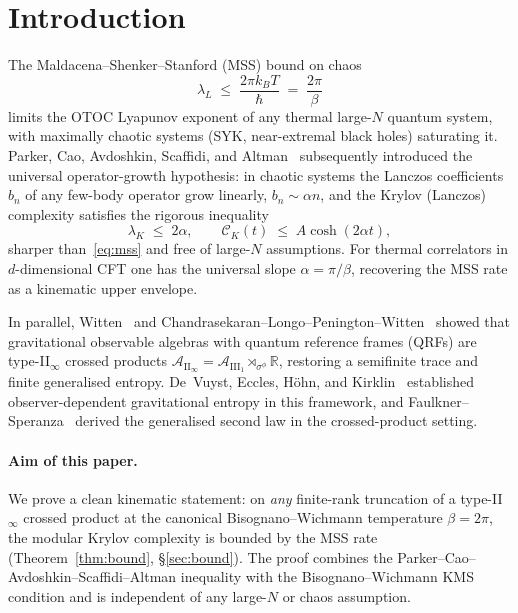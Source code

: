 \documentclass[12pt,a4paper]{article}
\begin{document}
\section{Introduction}
\label{sec:intro}

The Maldacena--Shenker--Stanford (MSS) bound on chaos~\cite{MSS2016}
\begin{equation}
  \lambda_L \;\le\; \frac{2\pi k_B T}{\hbar} \;=\; \frac{2\pi}{\beta}
  \label{eq:mss}
\end{equation}
limits the OTOC Lyapunov exponent of any thermal large-$N$ quantum system,
with maximally chaotic systems (SYK, near-extremal black holes)
saturating it.
Parker, Cao, Avdoshkin, Scaffidi, and Altman~\cite{Parker2019} subsequently
introduced the universal operator-growth hypothesis: in chaotic systems
the Lanczos coefficients $b_n$ of any few-body operator grow linearly,
$b_n \sim \alpha n$, and the Krylov (Lanczos) complexity satisfies
the rigorous inequality
\begin{equation}
  \lambda_K \;\le\; 2\alpha,\qquad
  \mathcal{C}_K(t) \;\le\; A \cosh(2\alpha t),
  \label{eq:parker}
\end{equation}
sharper than~\eqref{eq:mss} and free of large-$N$ assumptions.
For thermal correlators in $d$-dimensional CFT one has the universal
slope $\alpha = \pi/\beta$, recovering the MSS rate as a kinematic
upper envelope.

In parallel, Witten~\cite{Witten2022} and Chandrasekaran--Longo--Penington--Witten~\cite{CLPW2023}
showed that gravitational observable algebras with quantum reference
frames (QRFs) are type-II$_\infty$ crossed products
$\mathcal{A}_{\mathrm{II}_\infty} = \mathcal{A}_{\mathrm{III}_1}
\rtimes_{\sigma^\phi} \mathbb{R}$, restoring a semifinite trace and
finite generalised entropy.
De~Vuyst, Eccles, H\"{o}hn, and Kirklin~\cite{DEHK2025a,DEHK2025b}
established observer-dependent gravitational entropy in this framework,
and Faulkner--Speranza~\cite{FaulknerSperanza2024} derived the
generalised second law in the crossed-product setting.

\paragraph{Aim of this paper.}
We prove a clean kinematic statement:
on \emph{any} finite-rank truncation of a type-II$_\infty$ crossed
product at the canonical Bisognano--Wichmann temperature $\beta = 2\pi$,
the modular Krylov complexity is bounded by the MSS rate
(Theorem~\ref{thm:bound}, \S\ref{sec:bound}).
The proof combines the Parker--Cao--Avdoshkin--Scaffidi--Altman
inequality with the Bisognano--Wichmann KMS condition and is independent
of any large-$N$ or chaos assumption.
\end{document}
